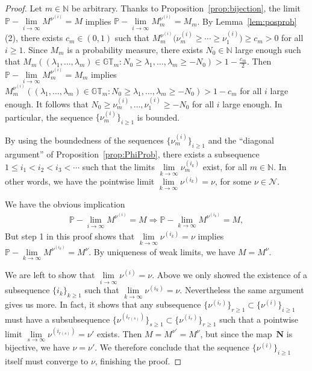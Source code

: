 \documentclass[pdftex]{sigma}
\numberwithin{equation}{section}
\newcommand{\N}{\mathbb{N}}
\newcommand{\Nu}{\mathcal{N}}
\newcommand{\GT}{\mathbb{GT}}
\newcommand{\NN}{\mathbf{N}}
\begin{document}
\begin{proof}
Let $m\in\N$ be arbitrary.
Thanks to Proposition~\ref{prop:bijection}, the limit $\mathbb{P}-\lim\limits_{i\rightarrow\infty}{M^{\nu^{(i)}}} = M$ implies $\mathbb{P}-\lim\limits_{i\rightarrow\infty}{M_m^{\nu^{(i)}}} = M_m$.
By Lemma~\ref{lem:posprob}(2), there exists $c_m \in (0, 1)$ such that $M_m^{\nu^{(i)}}\big(\nu_m^{(i)} \geq \cdots \geq \nu_1^{(i)}\big) \geq c_m > 0$ for all $i\geq 1$.
Since $M_m$ is a probability measure, there exists $N_0\in\N$ large enough such that $M_m((\lambda_1, \dots, \lambda_m)\in\GT_m\colon N_0 \geq \lambda_1, \dots, \lambda_m \geq -N_0) > 1 - \frac{c_m}{2}$.
Then $\mathbb{P}-\lim\limits_{i\rightarrow\infty}{M_m^{\nu^{(i)}}} = M_m$ implies $M_m^{\nu^{(i)}}((\lambda_1, \dots, \lambda_m)\in\GT_m \colon N_0 \geq \lambda_1, \dots, \lambda_m \geq -N_0) > 1 - c_m$ for all $i$ large enough.
It follows that $N_0 \geq \nu_m^{(i)}, \dots, \nu_1^{(i)} \geq -N_0$ for all $i$ large enough. In particular, the sequence $\big\{\nu_m^{(i)}\big\}_{i\geq 1}$ is bounded.

By using the boundedness of the sequences $\big\{\nu^{(i)}_m\big\}_{i\geq 1}$ and the ``diagonal argument'' of Proposition~\ref{prop:PhiProb}, there exists a subsequence $1\leq i_1 < i_2 < i_3 < \cdots$ such that the limits $\lim\limits_{k\rightarrow\infty}{\nu^{(i_k)}_m}$ exist, for all $m\in\N$. In other words, we have the pointwise limit $\lim\limits_{k\rightarrow\infty}{\nu^{(i_k)}} = \nu$, for some $\nu\in\Nu$.

We have the obvious implication
\begin{gather*}
\mathbb{P}-\lim_{i\rightarrow\infty}{M^{\nu^{(i)}}} = M \Longrightarrow \mathbb{P}-\lim_{k\rightarrow\infty}{M^{\nu^{(i_k)}}} = M,
\end{gather*}
But step 1 in this proof shows that $\lim\limits_{k\rightarrow\infty}{\nu^{(i_k)}} = \nu$ implies $\mathbb{P}-\lim\limits_{k\rightarrow\infty}{M^{\nu^{(i_k)}}} = M^{\nu}$. By uniqueness of weak limits, we have $M = M^{\nu}$.

We are left to show that $\lim\limits_{i\rightarrow\infty}{\nu^{(i)}} = \nu$. Above we only showed the existence of a subsequence $\{i_k\}_{k\geq 1}$ such that $\lim\limits_{k\rightarrow\infty}{\nu^{(i_k)}} = \nu$. Nevertheless the same argument gives us more. In fact, it shows that any subsequence $\big\{\nu^{(i_r)}\big\}_{r\geq 1} \subset \big\{\nu^{(i)}\big\}_{i\geq 1}$ must have a subsubsequence $\big\{\nu^{(i_{r(s)})}\big\}_{s\geq 1} \subset \big\{\nu^{(i_r)}\big\}_{r\geq 1}$ such that a pointwise limit $\lim\limits_{s\rightarrow\infty}{\nu^{(i_{r(s)})}} = \nu'$ exists. Then $M = M^{\nu'} = M^{\nu}$, but since the map~$\NN$ is bijective, we have $\nu = \nu'$. We therefore conclude that the sequence $\big\{\nu^{(i)}\big\}_{i\geq 1}$ itself must converge to $\nu$, f\/inishing the proof.
\end{proof}
\end{document}
